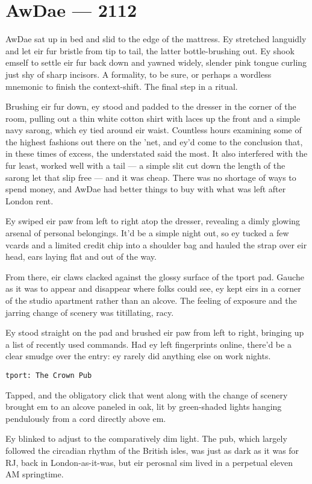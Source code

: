 \chapter*{AwDae — 2112}

AwDae sat up in bed and slid to the edge of the mattress. Ey stretched languidly and let eir fur bristle from tip to tail, the latter bottle-brushing out. Ey shook emself to settle eir fur back down and yawned widely, slender pink tongue curling just shy of sharp incisors. A formality, to be sure, or perhaps a wordless mnemonic to finish the context-shift. The final step in a ritual.

Brushing eir fur down, ey stood and padded to the dresser in the corner of the room, pulling out a thin white cotton shirt with laces up the front and a simple navy sarong, which ey tied around eir waist. Countless hours examining some of the highest fashions out there on the 'net, and ey'd come to the conclusion that, in these times of excess, the understated said the most. It also interfered with the fur least, worked well with a tail --- a simple slit cut down the length of the sarong let that slip free --- and it was cheap. There was no shortage of ways to spend money, and AwDae had better things to buy with what was left after London rent.

Ey swiped eir paw from left to right atop the dresser, revealing a dimly glowing arsenal of personal belongings. It'd be a simple night out, so ey tucked a few vcards and a limited credit chip into a shoulder bag and hauled the strap over eir head, ears laying flat and out of the way.

From there, eir claws clacked against the glossy surface of the tport pad. Gauche as it was to appear and disappear where folks could see, ey kept eirs in a corner of the studio apartment rather than an alcove. The feeling of exposure and the jarring change of scenery was titillating, racy.

Ey stood straight on the pad and brushed eir paw from left to right, bringing up a list of recently used commands. Had ey left fingerprints online, there'd be a clear smudge over the entry: ey rarely did anything else on work nights.

\texttt{tport:\ The\ Crown\ Pub}

Tapped, and the obligatory click that went along with the change of scenery brought em to an alcove paneled in oak, lit by green-shaded lights hanging pendulously from a cord directly above em.

Ey blinked to adjust to the comparatively dim light. The pub, which largely followed the circadian rhythm of the British isles, was just as dark as it was for RJ, back in London-as-it-was, but eir perosnal sim lived in a perpetual eleven AM springtime.

